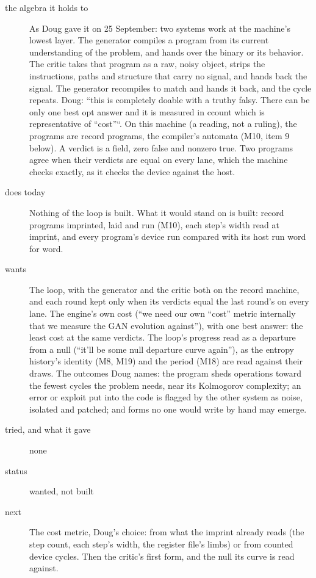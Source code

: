 \begin{description}
\item[{the algebra it holds to}] As Doug gave it on 25 September: two systems work at the machine's lowest layer. The generator compiles a program from its current understanding of the problem, and hands over the binary or its behavior. The critic takes that program as a raw, noisy object, strips the instructions, paths and structure that carry no signal, and hands back the signal. The generator recompiles to match and hands it back, and the cycle repeats. Doug: “this is completely doable with a truthy falsy. There can be only one best opt answer and it is measured in ccount which is representative of “cost”“. On this machine (a reading, not a ruling), the programs are record programs, the compiler's automata (M10, item 9 below). A verdict is a field, zero false and nonzero true. Two programs agree when their verdicts are equal on every lane, which the machine checks exactly, as it checks the device against the host.
\item[{does today}] Nothing of the loop is built. What it would stand on is built: record programs imprinted, laid and run (M10), each step's width read at imprint, and every program's device run compared with its host run word for word.
\item[{wants}] The loop, with the generator and the critic both on the record machine, and each round kept only when its verdicts equal the last round's on every lane. The engine's own cost (“we need our own “cost” metric internally that we measure the GAN evolution against”), with one best answer: the least cost at the same verdicts. The loop's progress read as a departure from a null (“it’ll be some null departure curve again”), as the entropy history's identity (M8, M19) and the period (M18) are read against their draws. The outcomes Doug names: the program sheds operations toward the fewest cycles the problem needs, near its Kolmogorov complexity; an error or exploit put into the code is flagged by the other system as noise, isolated and patched; and forms no one would write by hand may emerge.
\item[{tried, and what it gave}] none
\item[{status}] wanted, not built
\item[{next}] The cost metric, Doug's choice: from what the imprint already reads (the step count, each step's width, the register file's limbs) or from counted device cycles. Then the critic's first form, and the null its curve is read against.
\end{description}

